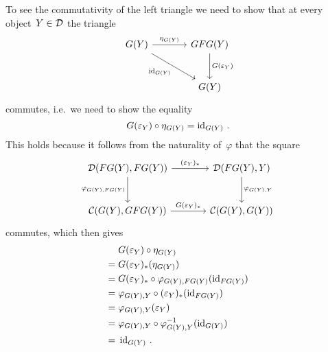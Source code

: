 \begin{remark}[continues = triangle equalities]
\begin{enumerate}[start=3]
      To see the commutativity of the left triangle we need to show that at every object~$Y \in \mathcal{D}$ the triangle
      \[
        \begin{tikzcd}[sep = large]
            G(Y)
            \arrow{r}[above]{\eta_{G(Y)}}
            \arrow{dr}[below left]{\id_{G(Y)}}
          & GFG(Y)
            \arrow{d}[right]{G(\varepsilon_Y)}
          \\
            {}
          & G(Y)
        \end{tikzcd}
      \]
      commutes, i.e.\ we need to show the equality
      \[
          G(\varepsilon_Y) \circ \eta_{G(Y)}
        = \operatorname{id}_{G(Y)} \,.
      \]
      This holds because it follows from the naturality of~$\varphi$ that the square
      \[
        \begin{tikzcd}[sep = large]
            \Dcat(FG(Y), FG(Y))
            \arrow{r}[above]{(\varepsilon_Y)_*}
            \arrow{d}[left]{\varphi_{G(Y),FG(Y)}}
          & \Dcat(FG(Y), Y)
            \arrow{d}[right]{\varphi_{G(Y),Y}}
          \\
            \Ccat(G(Y), GFG(Y))
            \arrow{r}[above]{G(\varepsilon_Y)_*}
          & \Ccat(G(Y), G(Y))
        \end{tikzcd}
      \]
      commutes, which then gives
      \begin{align*}
         {}&  G(\varepsilon_Y) \circ \eta_{G(Y)}  \\
        ={}&  G(\varepsilon_Y)_*( \eta_{G(Y)} ) \\
        ={}&  G(\varepsilon_Y)_* \circ \varphi_{G(Y), FG(Y)}( \operatorname{id}_{FG(Y)} ) \\
        ={}&  \varphi_{G(Y), Y} \circ (\varepsilon_Y)_*( \operatorname{id}_{FG(Y)} )  \\
        ={}&  \varphi_{G(Y), Y}( \varepsilon_Y )  \\
        ={}&  \varphi_{G(Y), Y} \circ \varphi_{G(Y),Y}^{-1}( \operatorname{id}_{G(Y)} )  \\
        ={}&  \operatorname{id}_{G(Y)} \,.
      \end{align*}
    

\end{enumerate}
\end{remark}
